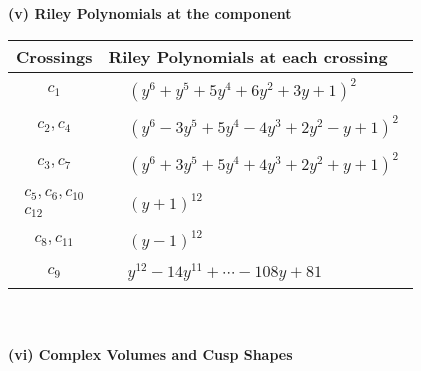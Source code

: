 \documentclass[1p]{elsarticle_modified}
\theoremstyle{definition}
\begin{document}
\newpage\renewcommand{\arraystretch}{1}
\flushleft \textbf{(v) Riley Polynomials at the component}\newline \\
\begin{tabular}{m{50pt}|m{274pt}}
Crossings & \hspace{64pt}Riley Polynomials at each crossing \\
\hline $$\begin{aligned}c_{1}\end{aligned}$$&$\begin{aligned}
&(y^6+y^5+5 y^4+6 y^2+3 y+1)^2
\end{aligned}$\\
\hline $$\begin{aligned}c_{2},c_{4}\end{aligned}$$&$\begin{aligned}
&(y^6-3 y^5+5 y^4-4 y^3+2 y^2- y+1)^2
\end{aligned}$\\
\hline $$\begin{aligned}c_{3},c_{7}\end{aligned}$$&$\begin{aligned}
&(y^6+3 y^5+5 y^4+4 y^3+2 y^2+y+1)^2
\end{aligned}$\\
\hline $$\begin{aligned}c_{5},c_{6},c_{10}\\c_{12}\end{aligned}$$&$\begin{aligned}
&(y+1)^{12}
\end{aligned}$\\
\hline $$\begin{aligned}c_{8},c_{11}\end{aligned}$$&$\begin{aligned}
&(y-1)^{12}
\end{aligned}$\\
\hline $$\begin{aligned}c_{9}\end{aligned}$$&$\begin{aligned}
&y^{12}-14 y^{11}+\cdots-108 y+81
\end{aligned}$\\
\hline
\end{tabular}\\~\\
\newpage\flushleft \textbf{(vi) Complex Volumes and Cusp Shapes}
\end{document}
